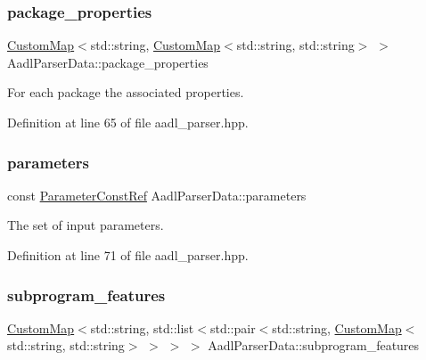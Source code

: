 \subsubsection{\texorpdfstring{package\+\_\+properties}{package\_properties}}
{\footnotesize\ttfamily \hyperlink{custom__map_8hpp_a18ca01763abbe3e5623223bfe5aaac6b}{Custom\+Map}$<$std\+::string, \hyperlink{custom__map_8hpp_a18ca01763abbe3e5623223bfe5aaac6b}{Custom\+Map}$<$std\+::string, std\+::string$>$ $>$ Aadl\+Parser\+Data\+::package\+\_\+properties}



For each package the associated properties. 



Definition at line 65 of file aadl\+\_\+parser.\+hpp.

\mbox{\label{structAadlParserData_ad7836437c882428d2580f2e56d6cdc20}} 
\subsubsection{\texorpdfstring{parameters}{parameters}}
{\footnotesize\ttfamily const \hyperlink{Parameter_8hpp_a37841774a6fcb479b597fdf8955eb4ea}{Parameter\+Const\+Ref} Aadl\+Parser\+Data\+::parameters}



The set of input parameters. 



Definition at line 71 of file aadl\+\_\+parser.\+hpp.

\mbox{\label{structAadlParserData_a04950aa5522cb22c90023d3c7c2fefab}} 
\subsubsection{\texorpdfstring{subprogram\+\_\+features}{subprogram\_features}}
{\footnotesize\ttfamily \hyperlink{custom__map_8hpp_a18ca01763abbe3e5623223bfe5aaac6b}{Custom\+Map}$<$std\+::string, std\+::list$<$std\+::pair$<$std\+::string, \hyperlink{custom__map_8hpp_a18ca01763abbe3e5623223bfe5aaac6b}{Custom\+Map}$<$std\+::string, std\+::string$>$ $>$ $>$ $>$ Aadl\+Parser\+Data\+::subprogram\+\_\+features}



